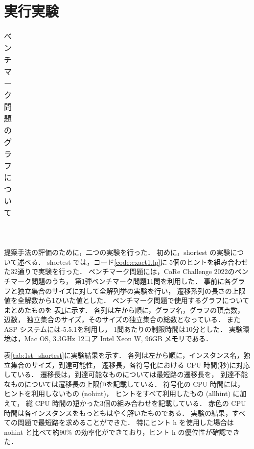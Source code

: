 \section{実行実験}\label{sec:experiment}

\begin{table}[tbp]
  \centering
  \caption{ベンチマーク問題のグラフについて}
  \begin{tabular}{lrrr|r}
    
  \end{tabular}
  \label{tab:graph}
\end{table}

\begin{table*}[tbp]
  \centering
  \caption{shortest の実験結果}
  \begin{tabular}{lr|lr|rrrrr}
    
  \end{tabular}
  \label{tab:1st_shortest}
\end{table*}

\begin{table*}[tbp]
  \centering
  \caption{longest の実験結果}
  \begin{tabular}{l|rrrrrrrr}
    
  \end{tabular}
  \label{tab:1st_longest}
\end{table*}

提案手法の評価のために，二つの実験を行った．
初めに，shortest の実験について述べる．
shortest では，コード\ref{code:exact1.lp}に
5個のヒントを組み合わせた32通りで実験を行った．
ベンチマーク問題には，CoRe Challenge 2022のベンチマーク問題のうち，
第1弾ベンチマーク問題11問を利用した．
事前に各グラフと独立集合のサイズに対して全解列挙の実験を行い，
遷移系列の長さの上限値を全解数から1ひいた値とした．
ベンチマーク問題で使用するグラフについてまとめたものを
表\ref{tab:graph}に示す．
各列は左から順に，グラフ名，グラフの頂点数，辺数，
独立集合のサイズ，そのサイズの独立集合の総数となっている．
また ASP システムには{\clingo}-5.5.1を利用し，
1問あたりの制限時間は10分とした．
実験環境は，Mac OS, 3.3GHz 12コア Intel Xeon W, 96GB メモリである．

表\ref{tab:1st_shortest}に実験結果を示す．
各列は左から順に，インスタンス名，独立集合のサイズ，到達可能性，
遷移長，各符号化における CPU 時間(秒)に対応している．
遷移長は，到達可能なものについては最短路の遷移長を，
到達不能なものについては遷移長の上限値を記載している．
符号化の CPU 時間には，ヒントを利用しないもの (nohint)，
ヒントをすべて利用したもの (allhint) に加えて，
総 CPU 時間の短かった3個の組み合わせを記載している．
赤色の CPU 時間は各インスタンスをもっともはやく解いたものである．
実験の結果，すべての問題で最短路を求めることができた．
特にヒント h を使用した場合は nohint と比べて約90{\%}
の効率化ができており，ヒント h の優位性が確認できた．


